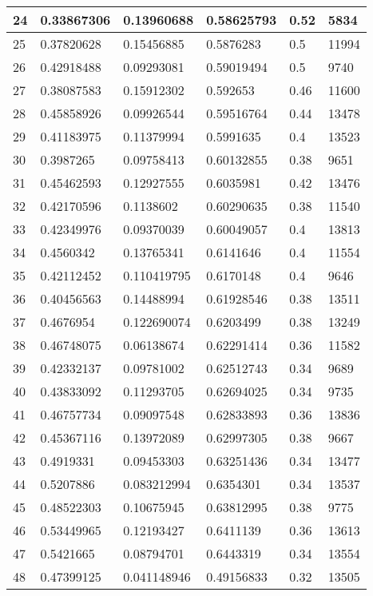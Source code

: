 \begin{longtable}{|l|l|l|l|l|l|}
24 & 0.33867306 & 0.13960688 & 0.58625793 & 0.52 & 5834 \\ \hline 
25 & 0.37820628 & 0.15456885 & 0.5876283 & 0.5 & 11994 \\ \hline 
26 & 0.42918488 & 0.09293081 & 0.59019494 & 0.5 & 9740 \\ \hline 
27 & 0.38087583 & 0.15912302 & 0.592653 & 0.46 & 11600 \\ \hline 
28 & 0.45858926 & 0.09926544 & 0.59516764 & 0.44 & 13478 \\ \hline 
29 & 0.41183975 & 0.11379994 & 0.5991635 & 0.4 & 13523 \\ \hline 
30 & 0.3987265 & 0.09758413 & 0.60132855 & 0.38 & 9651 \\ \hline 
31 & 0.45462593 & 0.12927555 & 0.6035981 & 0.42 & 13476 \\ \hline 
32 & 0.42170596 & 0.1138602 & 0.60290635 & 0.38 & 11540 \\ \hline 
33 & 0.42349976 & 0.09370039 & 0.60049057 & 0.4 & 13813 \\ \hline 
34 & 0.4560342 & 0.13765341 & 0.6141646 & 0.4 & 11554 \\ \hline 
35 & 0.42112452 & 0.110419795 & 0.6170148 & 0.4 & 9646 \\ \hline 
36 & 0.40456563 & 0.14488994 & 0.61928546 & 0.38 & 13511 \\ \hline 
37 & 0.4676954 & 0.122690074 & 0.6203499 & 0.38 & 13249 \\ \hline 
38 & 0.46748075 & 0.06138674 & 0.62291414 & 0.36 & 11582 \\ \hline 
39 & 0.42332137 & 0.09781002 & 0.62512743 & 0.34 & 9689 \\ \hline 
40 & 0.43833092 & 0.11293705 & 0.62694025 & 0.34 & 9735 \\ \hline 
41 & 0.46757734 & 0.09097548 & 0.62833893 & 0.36 & 13836 \\ \hline 
42 & 0.45367116 & 0.13972089 & 0.62997305 & 0.38 & 9667 \\ \hline 
43 & 0.4919331 & 0.09453303 & 0.63251436 & 0.34 & 13477 \\ \hline 
44 & 0.5207886 & 0.083212994 & 0.6354301 & 0.34 & 13537 \\ \hline 
45 & 0.48522303 & 0.10675945 & 0.63812995 & 0.38 & 9775 \\ \hline 
46 & 0.53449965 & 0.12193427 & 0.6411139 & 0.36 & 13613 \\ \hline 
47 & 0.5421665 & 0.08794701 & 0.6443319 & 0.34 & 13554 \\ \hline 
48 & 0.47399125 & 0.041148946 & 0.49156833 & 0.32 & 13505 \\ \hline 

\end{longtable}

